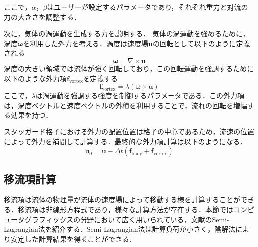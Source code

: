 \documentclass[a4j,12pt]{jreport}
\begin{document}
ここで，$\alpha$，$\beta$はユーザーが設定するパラメータであり，それぞれ重力と対流の力の大きさを調整する．

次に，気体の渦運動を生成する力を説明する．
気体の渦運動を強めるために，渦度$\boldsymbol{\omega}$を利用した外力を考える．渦度は速度場$\bm{u}$の回転として以下のように定義される
\[
    \boldsymbol{\omega} = \nabla \times \bm{u}
\]
渦度の大きい領域では流体が強く回転しており，この回転運動を強調するために以下のような外力項$\bm{f}_{\text{vortex}}$を定義する
\[
    \bm{f}_{\text{vortex}} = \lambda (\boldsymbol{\omega} \times \bm{u})
\]
ここで，$\lambda$は渦運動を強調する強度を制御するパラメータである．この外力項は，渦度ベクトルと速度ベクトルの外積を利用することで，流れの回転を増幅する効果を持つ．

スタッガード格子における外力の配置位置は格子の中心であるため，流速の位置によって外力を補間して計算する．最終的な外力項計算は以下のようになる．
\begin{equation}
	\bm{u}_0 =  \bm{u}  - \varDelta t(\bm{f}_{\text{buoy}} +  \bm{f}_{\text{vortex}} ) 
\end{equation} 


\subsection{移流項計算}
移流項は流体の物理量が流体の速度場によって移動する様を計算することができる．移流項は非線形方程式であり，様々な計算方法が存在する．本節ではコンピュータグラフィックスの分野において広く用いられている，文献\cite{stam}のSemi-Lagrangian法を紹介する．Semi-Lagrangian法は計算負荷が小さく，陰解法により安定した計算結果を得ることができる．
\end{document}
